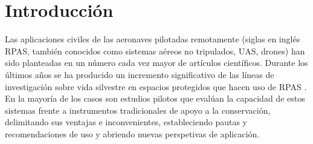 \documentclass[onecolumn]{extarticle}
\begin{document}
{
\fontsize{8}{10} 
\hypersetup{linkcolor=black}
\setcounter{tocdepth}{2}
\tableofcontents
}


\vskip 6.5pt

\noindent \doublespacing \section{Introducción}\label{introduccion}

Las aplicaciones civiles de las aeronaves pilotadas remotamente (siglas
en inglés RPAS, también conocidos como sistemas aéreos no tripulados,
UAS, drones) han sido planteadas en un número cada vez mayor de
artículos científicos. Durante los últimos años se ha producido un
incremento significativo de las líneas de investigación sobre vida
silvestre en espacios protegidos que hacen uso de RPAS
\citep{Linchant2015, Christie2016}. En la mayoría de los casos son
estudios pilotos que evalúan la capacidad de estos sistemas frente a
instrumentos tradicionales de apoyo a la conservación, delimitando sus
ventajas e inconvenientes, estableciendo pautas y recomendaciones de uso
y abriendo nuevas perspetivas de aplicación.
\end{document}
